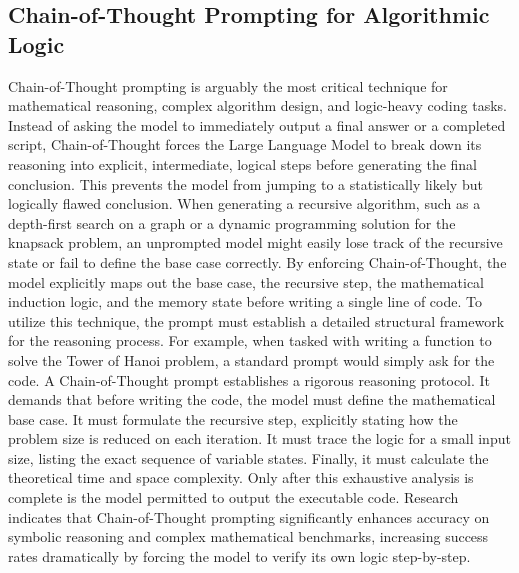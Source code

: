 \documentclass[12pt]{article}
\begin{document}
\subsection{Chain-of-Thought Prompting for Algorithmic Logic}
Chain-of-Thought prompting is arguably
the most critical technique for mathematical reasoning, complex algorithm design, and logic-heavy coding
tasks. Instead of asking the model to immediately output a final answer or a completed script, Chain-of-Thought
forces the Large Language Model to break down its reasoning into explicit, intermediate, logical steps before
generating the final conclusion. This prevents the model from jumping to a statistically likely but logically
flawed conclusion. When generating a recursive algorithm, such as a depth-first search on a graph or a dynamic
programming solution for the knapsack problem, an unprompted model might easily lose track of the recursive
state or fail to define the base case correctly. By enforcing Chain-of-Thought, the model explicitly maps out
the base case, the recursive step, the mathematical induction logic, and the memory state before writing a
single line of code. To utilize this technique, the prompt must establish a detailed structural framework for
the reasoning process. For example, when tasked with writing a function to solve the Tower of Hanoi problem, a
standard prompt would simply ask for the code. A Chain-of-Thought prompt establishes a rigorous reasoning
protocol. It demands that before writing the code, the model must define the mathematical base case. It must
formulate the recursive step, explicitly stating how the problem size is reduced on each iteration. It must
trace the logic for a small input size, listing the exact sequence of variable states. Finally, it must
calculate the theoretical time and space complexity. Only after this exhaustive analysis is complete is the
model permitted to output the executable code. Research indicates that Chain-of-Thought prompting significantly
enhances accuracy on symbolic reasoning and complex mathematical benchmarks, increasing success rates
dramatically by forcing the model to verify its own logic step-by-step. 
\end{document}
